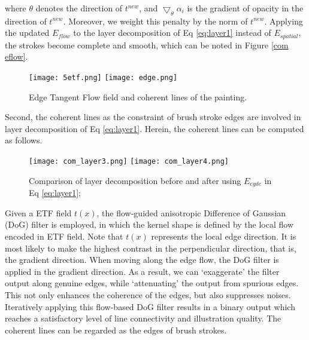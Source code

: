 where $\theta$ denotes the direction of $t^{new}$, and $ \bigtriangledown_{\theta}\alpha_{i} $ is the gradient of opacity in the direction of $t^{new}$. Moreover, we weight this penalty by the norm of $t^{new}$. Applying the updated $E_{flow}$ to the layer decomposition of Eq \ref{eq:layer1} instead of $E_{spatial}$, the strokes become complete and smooth, which can be noted in Figure \ref{com eflow}.

\begin{figure}[H]
	\centering
	\texttt{[image: 5etf.png]}
	\texttt{[image: edge.png]}
	\caption{Edge Tangent Flow field and coherent lines of the painting.}
\end{figure}


Second, the coherent lines as the constraint of brush stroke edges are involved in layer decomposition of Eq \ref{eq:layer1}. Herein, the coherent lines can be computed as follows.
\begin{figure}[H]
	\centering
	\texttt{[image: com\_layer3.png]}
	\texttt{[image: com\_layer4.png]}
	\caption{Comparison of layer decomposition before and after using $E_{egde}$  in Eq \ref{eq:layer1}; }
	\label{com:edge}
\end{figure}
Given a ETF field $t(x)$, the flow-guided anisotropic Difference of Gaussian (DoG) filter is employed, in which the kernel shape is defined by the local flow encoded in ETF field. Note that $t(x)$ represents the local edge direction. It is most likely to make the highest contrast in the perpendicular direction, that is, the gradient direction. When moving along the edge flow, the DoG filter is applied in the gradient direction. As a result, we can ‘exaggerate’ the filter output along genuine edges, while ‘attenuating’ the output from spurious edges. This not only enhances the coherence of the edges, but also suppresses noises. Iteratively applying this flow-based DoG filter results in a binary output which reaches a satisfactory level of line connectivity and illustration quality. The coherent lines can be regarded as the edges of brush strokes.

